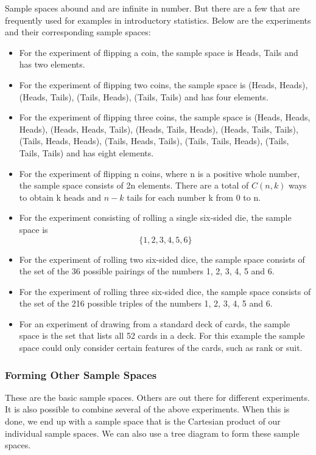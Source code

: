 \documentclass[12pt]{article}
\begin{document}
Sample spaces abound and are infinite in number. But there are a few that are frequently used for examples in introductory statistics. Below are the experiments and their corresponding sample spaces:

\begin{itemize}
\item For the experiment of flipping a coin, the sample space is {Heads, Tails} and has two elements.

\item For the experiment of flipping two coins, the sample space is {(Heads, Heads), (Heads, Tails), (Tails, Heads), (Tails, Tails) } and has four elements.

\item For the experiment of flipping three coins, the sample space is {(Heads, Heads, Heads), (Heads, Heads, Tails), (Heads, Tails, Heads), (Heads, Tails, Tails), (Tails, Heads, Heads), (Tails, Heads, Tails), (Tails, Tails, Heads), (Tails, Tails, Tails) } and has eight elements.

\item For the experiment of flipping n coins, where n is a positive whole number, the sample space consists of 2n elements. There are a total of $C(n, k)$ ways to obtain k heads and $n - k$ tails for each number k from 0 to n.

\item For the experiment consisting of rolling a single six-sided die, the sample space is 
\[\{1, 2, 3, 4, 5, 6\} \]
\item For the experiment of rolling two six-sided dice, the sample space consists of the set of the 36 possible pairings of the numbers 1, 2, 3, 4, 5 and 6.
\item For the experiment of rolling three six-sided dice, the sample space consists of the set of the 216 possible triples of the numbers 1, 2, 3, 4, 5 and 6.
\item For an experiment of drawing from a standard deck of cards, the sample space is the set that lists all 52 cards in a deck. For this example the sample space could only consider certain features of the cards, such as rank or suit.
\end{itemize}

\subsubsection{Forming Other Sample Spaces}

These are the basic sample spaces. Others are out there for different experiments. It is also possible to combine several of the above experiments. When this is done, we end up with a sample space that is the Cartesian product of our individual sample spaces. We can also use a tree diagram to form these sample spaces.
\end{document}
